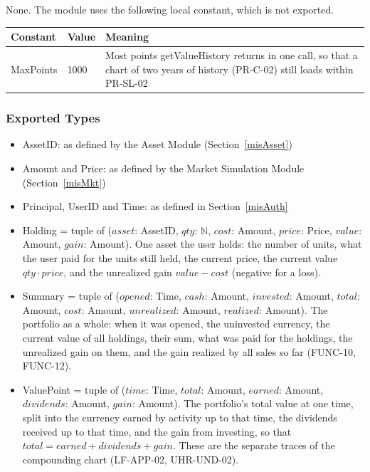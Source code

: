 \documentclass[12pt, titlepage]{article}
\begin{document}
None. The module uses the following local constant, which is not exported.

\begin{center}
\renewcommand{\arraystretch}{1.2}
\begin{tabular}{l l >{\raggedright\arraybackslash}p{7cm}}
\toprule
\textbf{Constant} & \textbf{Value} & \textbf{Meaning}\\
\midrule
\textsf{MaxPoints} & 1000 & Most points getValueHistory returns in one
  call, so that a chart of two years of history (PR-C-02) still loads within
  PR-SL-02\\
\bottomrule
\end{tabular}
\end{center}

\subsubsection{Exported Types}

\begin{itemize}
\item AssetID: as defined by the Asset Module (Section~\ref{misAsset})
\item Amount and Price: as defined by the Market Simulation Module
  (Section~\ref{misMkt})
\item Principal, UserID and Time: as defined in Section~\ref{misAuth}
\item Holding = tuple of ($\mathit{asset}$: AssetID, $\mathit{qty}$:
  $\mathbb{N}$, $\mathit{cost}$: Amount, $\mathit{price}$: Price,
  $\mathit{value}$: Amount, $\mathit{gain}$: Amount). One asset the user
  holds: the number of units, what the user paid for the units still held,
  the current price, the current value $\mathit{qty} \cdot \mathit{price}$,
  and the unrealized gain $\mathit{value} - \mathit{cost}$ (negative for a
  loss).
\item Summary = tuple of ($\mathit{opened}$: Time, $\mathit{cash}$: Amount,
  $\mathit{invested}$: Amount, $\mathit{total}$: Amount, $\mathit{cost}$:
  Amount, $\mathit{unrealized}$: Amount, $\mathit{realized}$: Amount). The
  portfolio as a whole: when it was opened, the uninvested currency, the
  current value of all holdings, their sum, what was paid for the holdings,
  the unrealized gain on them, and the gain realized by all sales so far
  (FUNC-10, FUNC-12).
\item ValuePoint = tuple of ($\mathit{time}$: Time, $\mathit{total}$:
  Amount, $\mathit{earned}$: Amount, $\mathit{dividends}$: Amount,
  $\mathit{gain}$: Amount). The portfolio's total value at one time, split
  into the currency earned by activity up to that time, the dividends
  received up to that time, and the gain from investing, so that
  $\mathit{total} = \mathit{earned} + \mathit{dividends} + \mathit{gain}$.
  These are the separate traces of the compounding chart (LF-APP-02,
  UHR-UND-02).
\end{itemize}
\end{document}
